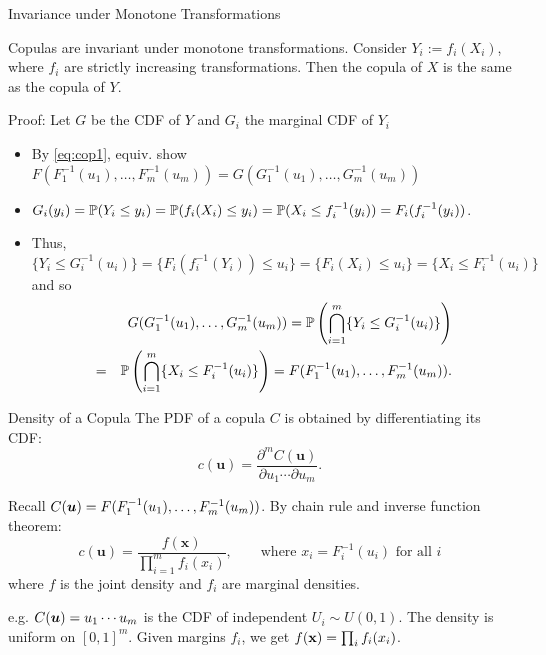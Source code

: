 \documentclass[11pt,handout,aspectratio=169]{beamer}
\begin{document}
\begin{frame}{Invariance under Monotone Transformations}
\begin{alertblock}{Copulas are invariant under monotone transformations. }
	Consider $Y_i := f_i(X_i)$, where $f_i$ are strictly increasing transformations. Then the copula of $X$ is the same as the copula of $Y$. 
\end{alertblock}
Proof: Let $G$ be the CDF of $Y$ and $G_i$ the marginal CDF of $Y_i$
    \begin{itemize}
    \item By \eqref{eq:cop1}, equiv. show $F(F_1^{-1}(u_1), \ldots, F_m^{-1}(u_m))=G(G_1^{-1}(u_1), \ldots, G_m^{-1}(u_m))$
        \item $G_i(y_i)=\P(Y_i\leq y_i)=\P(f_i(X_i)\leq y_i)=\P(X_i\leq f_i^{-1}(y_i))=F_i(f_i^{-1}(y_i))$.
        \item Thus, $\{Y_i\leq G_i^{-1}(u_i)\}=\{F_i(f_i^{-1}(Y_i))\leq u_i\}=\{F_i(X_i)\leq u_i\}=\{X_i\leq F^{-1}_i(u_i)\}$ and so  
      \begin{eqnarray*}
      	&&G(G_1^{-1}(u_1),\ldots, G_m^{-1}(u_m))= \P\left(\bigcap_{i=1}^m \{Y_i\leq G^{-1}_i(u_i)\}\right)\\
      	&=&\P\left(\bigcap_{i=1}^m \{X_i\leq F^{-1}_i(u_i)\}\right)=F(F_1^{-1}(u_1), \ldots, F_m^{-1}(u_m)).
      \end{eqnarray*} 
    \end{itemize}
\end{frame}

\begin{frame}{Density of a Copula}
The PDF of a copula $C$ is obtained by differentiating its CDF:
    \[ c(\mathbf{u}) = \frac{\partial^m C(\mathbf{u})}{\partial u_1 \cdots \partial u_m}. \]
    
    Recall $C(\bs u)=F(F_1^{-1}(u_1),\ldots, F_m^{-1}(u_m))$. By chain rule and inverse function theorem:
    \[ c(\mathbf{u}) = \frac{f(\mathbf{x})}{\prod_{i=1}^m f_i(x_i)},\qquad \mbox{where } x_i=F_i^{-1}(u_i)\mbox{ for all }i \]
    where $f$ is the joint density and $f_i$ are marginal densities.
    \bigskip
    
    e.g. $C(\bs u)=u_1\cdots u_m$ is the CDF of independent $U_i\sim U(0,1)$. The density is uniform on $[0,1]^m$. Given margins $f_i$, we get $f(\x)=\prod_i f_i(x_i)$.
\end{frame}
\end{document}
